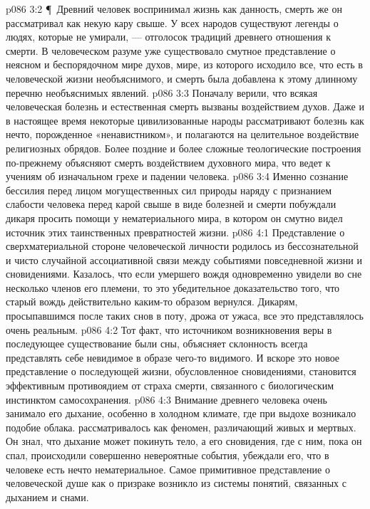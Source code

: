 \vs p086 3:2 \P\ Древний человек воспринимал жизнь как данность, смерть же он рассматривал как некую кару свыше. У всех народов существуют легенды о людях, которые не умирали, --- отголосок традиций древнего отношения к смерти. В человеческом разуме уже существовало смутное представление о неясном и беспорядочном мире духов, мире, из которого исходило все, что есть в человеческой жизни необъяснимого, и смерть была добавлена к этому длинному перечню необъяснимых явлений.
\vs p086 3:3 Поначалу верили, что всякая человеческая болезнь и естественная смерть вызваны воздействием духов. Даже и в настоящее время некоторые цивилизованные народы рассматривают болезнь как нечто, порожденное «ненавистником», и полагаются на целительное воздействие религиозных обрядов. Более поздние и более сложные теологические построения по\hyp{}прежнему объясняют смерть воздействием духовного мира, что ведет к учениям об изначальном грехе и падении человека.
\vs p086 3:4 Именно сознание бессилия перед лицом могущественных сил природы наряду с признанием слабости человека перед карой свыше в виде болезней и смерти побуждали дикаря просить помощи у нематериального мира, в котором он смутно видел источник этих таинственных превратностей жизни.
\vs p086 4:1 Представление о сверхматериальной стороне человеческой личности родилось из бессознательной и чисто случайной ассоциативной связи между событиями повседневной жизни и сновидениями. Казалось, что если умершего вождя одновременно увидели во сне несколько членов его племени, то это убедительное доказательство того, что старый вождь действительно каким\hyp{}то образом вернулся. Дикарям, просыпавшимся после таких снов в поту, дрожа от ужаса, все это представлялось очень реальным.
\vs p086 4:2 Тот факт, что источником возникновения веры в последующее существование были сны, объясняет склонность всегда представлять себе невидимое в образе чего\hyp{}то видимого. И вскоре это новое представление о последующей жизни, обусловленное сновидениями, становится эффективным противоядием от страха смерти, связанного с биологическим инстинктом самосохранения.
\vs p086 4:3 Внимание древнего человека очень занимало его дыхание, особенно в холодном климате, где при выдохе возникало подобие облака.  рассматривалось как феномен, различающий живых и мертвых. Он знал, что дыхание может покинуть тело, а его сновидения, где с ним, пока он спал, происходили совершенно невероятные события, убеждали его, что в человеке есть нечто нематериальное. Самое примитивное представление о человеческой душе как о призраке возникло из системы понятий, связанных с дыханием и снами.
